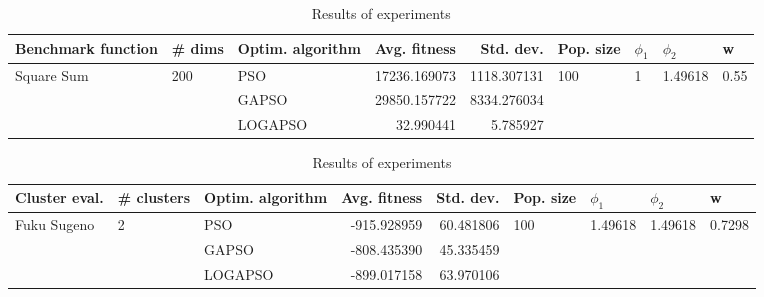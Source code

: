 \documentclass{article}
\begin{document}
\begin{table}
\centering
\caption{Results of experiments}
\begin{tabular}{lllrrllll}
\toprule
         Benchmark function &              \# dims & Optim. algorithm &  Avg. fitness &   Std. dev. &            Pop. size &         $\phi_{1}$ &               $\phi_{2}$ &                     w \\
\midrule
\multirow{3}{*}{Square Sum} & \multirow{3}{*}{200} &              PSO &  17236.169073 & 1118.307131 & \multirow{3}{*}{100} & \multirow{3}{*}{1} & \multirow{3}{*}{1.49618} & \multirow{3}{*}{0.55} \\
                            &                      &            GAPSO &  29850.157722 & 8334.276034 &                      &                    &                          &                       \\
                            &                      &          LOGAPSO &     32.990441 &    5.785927 &                      &                    &                          &                       \\
\bottomrule
\end{tabular}
\end{table}
\begin{table}
\centering
\caption{Results of experiments}
\begin{tabular}{lllrrllll}
\toprule
               Cluster eval. &        \# clusters & Optim. algorithm &  Avg. fitness &  Std. dev. &            Pop. size &               $\phi_{1}$ &               $\phi_{2}$ &                       w \\
\midrule
\multirow{3}{*}{Fuku Sugeno} & \multirow{3}{*}{2} &              PSO &   -915.928959 &  60.481806 & \multirow{3}{*}{100} & \multirow{3}{*}{1.49618} & \multirow{3}{*}{1.49618} & \multirow{3}{*}{0.7298} \\
                             &                    &            GAPSO &   -808.435390 &  45.335459 &                      &                          &                          &                         \\
                             &                    &          LOGAPSO &   -899.017158 &  63.970106 &                      &                          &                          &                         \\
\bottomrule
\end{tabular}
\end{table}
\end{document}
